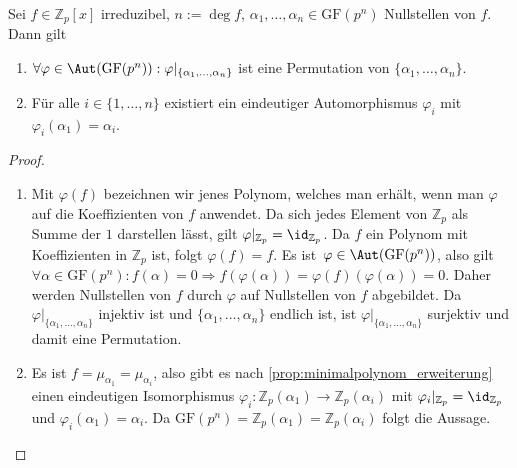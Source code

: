 \begin{lemma}
    Sei $f \in \mathbb{Z}_p[x]$ irreduzibel, $n := \deg f$, $\alpha_1, \ldots, \alpha_n \in \mathrm{GF}(p^n)$ Nullstellen von $f$. Dann gilt
    \begin{enumerate}
        \item $\forall\varphi\in\Aut(\mathrm{GF}(p^n)): \varphi\vert_{\{\alpha_1, \ldots, \alpha_n\}}$ ist eine Permutation von $\{\alpha_1, \ldots, \alpha_n\}$.
        \item Für alle $i \in \{1, \ldots, n\}$ existiert ein eindeutiger Automorphismus $\varphi_i$ mit $\varphi_i(\alpha_1) = \alpha_i$.
    \end{enumerate}
\end{lemma}
\begin{proof}{\ }
    \begin{enumerate}
        \item Mit $\varphi(f)$ bezeichnen wir jenes Polynom, welches man erhält, wenn man $\varphi$ auf die Koeffizienten von $f$ anwendet. Da sich jedes Element von $\mathbb{Z}_p$ als Summe der $1$ darstellen lässt, gilt $\varphi\vert_{\mathbb{Z}_p}=\id_{\mathbb{Z}_p}$. Da $f$ ein Polynom mit Koeffizienten in $\mathbb{Z}_p$ ist, folgt $\varphi(f)=f$. Es ist $\varphi \in \Aut(\mathrm{GF}(p^n))$, also gilt $\forall\alpha\in \mathrm{GF}(p^n): f(\alpha) = 0 \Rightarrow f(\varphi(\alpha)) = \varphi(f)(\varphi(\alpha)) = 0$. Daher werden Nullstellen von $f$ durch $\varphi$ auf Nullstellen von $f$ abgebildet. 
        Da $\varphi\vert_{\{\alpha_1, \ldots, \alpha_n\}}$ injektiv ist und $\{\alpha_1, \ldots, \alpha_n\}$ endlich ist, ist $\varphi\vert_{\{\alpha_1, \ldots, \alpha_n\}}$ surjektiv und damit eine Permutation.

        \item Es ist $f = \mu_{\alpha_1} = \mu_{\alpha_i}$, also gibt es nach \cref{prop:minimalpolynom_erweiterung} einen eindeutigen Isomorphismus $\varphi_i: \mathbb{Z}_p(\alpha_1) \to \mathbb{Z}_p(\alpha_i)$ mit $\varphi_i\vert_{\mathbb{Z}_p} = \id_{\mathbb{Z}_p}$ und $\varphi_i(\alpha_1) = \alpha_i$. Da $\mathrm{GF}(p^n) = \mathbb{Z}_p(\alpha_1) = \mathbb{Z}_p(\alpha_i)$ folgt die Aussage.
     \end{enumerate}
\end{proof}

